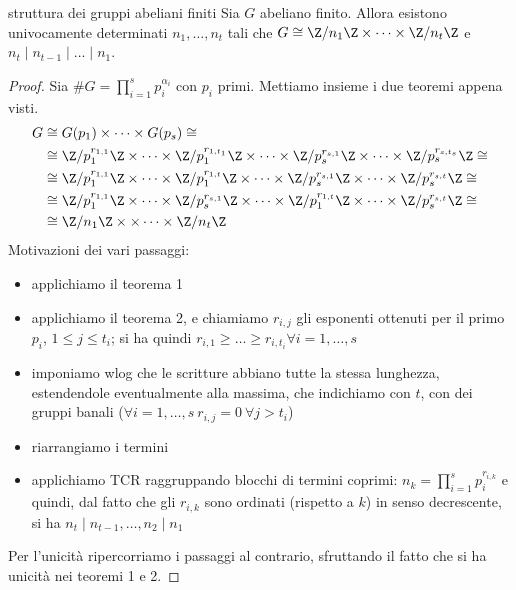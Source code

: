 \begin{theorem}{struttura dei gruppi abeliani finiti}
    Sia $G$ abeliano finito. Allora esistono univocamente determinati $n_1, \dots, n_t$ tali che $G \cong \Z/n_1\Z \times \dots \times \Z/n_t\Z$ e $n_t \mid n_{t-1} \mid \dots \mid n_1$.
\end{theorem}
\begin{proof}
    Sia $\#G = \prod_{i = 1}^s p_i^{\alpha_i}$ con $p_i$ primi. Mettiamo insieme i due teoremi appena visti.
    \begin{align}
        G & \cong G(p_1) \times \dots \times G(p_s) \cong \\
        & \cong \Z/p_1^{r_{1,1}}\Z \times \dots \times \Z/p_1^{r_{1,t_1}}\Z \times \dots \times \Z/p_s^{r_{s,1}}\Z \times \dots \times \Z/p_s^{r_{s,t_s}}\Z \cong \\
        & \cong \Z/p_1^{r_{1,1}}\Z \times \dots \times \Z/p_1^{r_{1,t}}\Z \times \dots \times \Z/p_s^{r_{s,1}}\Z \times \dots \times \Z/p_s^{r_{s,t}}\Z \cong  \\
        & \cong \Z/p_1^{r_{1,1}}\Z \times \dots \times \Z/p_s^{r_{s,1}}\Z \times \dots \times \Z/p_1^{r_{1,t}}\Z \times \dots \times \Z/p_s^{r_{s,t}}\Z \cong  \\
        & \cong \Z/n_1\Z \times \times \dots \times \Z/n_t\Z 
        \end{align}
    Motivazioni dei vari passaggi:
    \begin{itemize}
        \item[(1)] applichiamo il teorema 1
        \item[(2)] applichiamo il teorema 2, e chiamiamo $r_{i,j}$ gli esponenti ottenuti per il primo $p_i$, $1 \leq j \leq t_i$; si ha quindi $r_{i,1} \geq \dots \geq r_{i,t_i} \forall i = 1,\dots, s$
        \item[(3)] imponiamo wlog che le scritture abbiano tutte la stessa lunghezza, estendendole eventualmente alla massima, che indichiamo con $t$, con dei gruppi banali ($\forall i = 1,\dots,s \ r_{i,j} = 0 \ \forall j > t_i$)
        \item[(4)] riarrangiamo i termini
        \item[(5)] applichiamo TCR raggruppando blocchi di termini coprimi: $n_k = \prod_{i = 1}^s p_i^{r_{i,k}}$ e quindi, dal fatto che gli $r_{i,k}$ sono ordinati (rispetto a $k$) in senso decrescente, si ha $n_t \mid n_{t-1},  \dots, n_2 \mid n_1$
    \end{itemize}
    Per l'unicità ripercorriamo i passaggi al contrario, sfruttando il fatto che si ha unicità nei teoremi 1 e 2.
\end{proof} 

